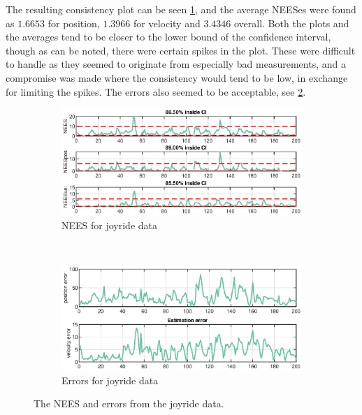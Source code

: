 The resulting consistency plot can be seen \cref{fig:ga_1_joyride_NEES}, and the average NEESes were found as $1.6653$ for position, $1.3966$ for velocity and $3.4346$ overall. Both the plots and the averages tend to be closer to the lower bound of the confidence interval, though as can be noted, there were certain spikes in the plot. These were difficult to handle as they seemed to originate from especially bad measurements, and a compromise was made where the consistency would tend to be low, in exchange for limiting the spikes. The errors also seemed to be acceptable, see \cref{fig:ga_1_joyride_error}. 

\begin{figure}[ht]
	\begin{subfigure}[h]{0.4\textwidth}
		\includegraphics[width=\textwidth]{figures/ga_1/joyride_NEES}
		\caption{NEES for joyride data}
		\label{fig:ga_1_joyride_NEES}
    \end{subfigure}%
    ~
    \begin{subfigure}[h]{0.4\textwidth}
        \includegraphics[width=\textwidth]{figures/ga_1/joyride_error}
        \caption{Errors for joyride data}
        \label{fig:ga_1_joyride_error}
    \end{subfigure}
    \caption{The NEES and errors from the joyride data. }
    \label{fig:ga_1_joyride_NEES_and_error} 
\end{figure}

